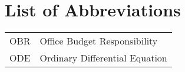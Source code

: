 

\section*{List of Abbreviations}

\begin{doublespacing}
	\begin{center}
			\begin{longtable}{l l}
				OBR		&	Office Budget Responsibility \\
				ODE		&	Ordinary Differential Equation \\
			\end{longtable}
	\end{center}
\end{doublespacing}

